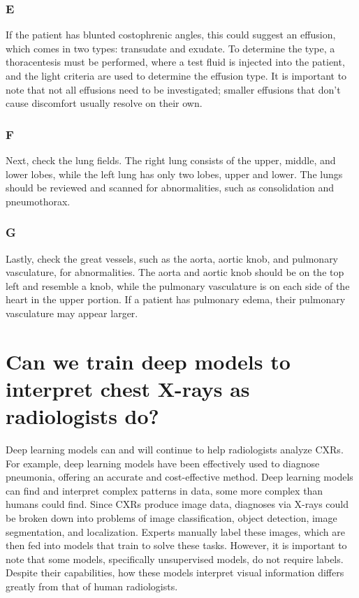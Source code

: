 \documentclass[10pt,twocolumn,letterpaper]{article}
\begin{document}
\subsubsection{E}
If the patient has blunted costophrenic angles, this could suggest an effusion, which comes in two types: transudate and exudate. To determine the type, a thoracentesis must be performed, where a test fluid is injected into the patient, and the light criteria are used to determine the effusion type. It is important to note that not all effusions need to be investigated; smaller effusions that don’t cause discomfort usually resolve on their own.
\subsubsection{F}
Next, check the lung fields. The right lung consists of the upper, middle, and lower lobes, while the left lung has only two lobes, upper and lower. The lungs should be reviewed and scanned for abnormalities, such as consolidation and pneumothorax.
\subsubsection{G}
Lastly, check the great vessels, such as the aorta, aortic knob, and pulmonary vasculature, for abnormalities. The aorta and aortic knob should be on the top left and resemble a knob, while the pulmonary vasculature is on each side of the heart in the upper portion. If a patient has pulmonary edema, their pulmonary vasculature may appear larger.
\section{Can we train deep models to interpret chest X-rays as radiologists do?}
Deep learning models can and will continue to help radiologists analyze CXRs. For example, deep learning models have been effectively used to diagnose pneumonia\cite{jimaging10080176}, offering an accurate and cost-effective method. Deep learning models can find and interpret complex patterns in data, some more complex than humans could find. Since CXRs produce image data, diagnoses via X-rays could be broken down into problems of image classification, object detection, image segmentation, and localization. Experts manually label these images, which are then fed into models that train to solve these tasks. However, it is important to note that some models, specifically unsupervised models, do not require labels. Despite their capabilities, how these models interpret visual information differs greatly from that of human radiologists. 
\end{document}
